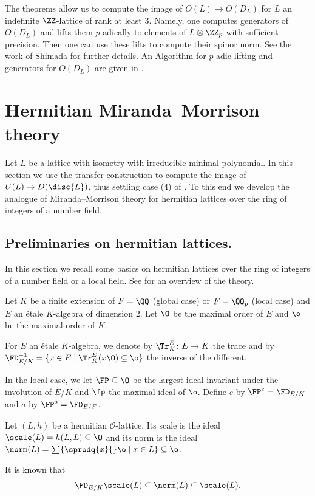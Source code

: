 \begin{remark}
 The theorems allow us to compute the image of $O(L) \to O(D_L)$ for $L$
 an indefinite $\ZZ$-lattice of rank at least $3$. Namely, one computes generators of $O(D_L)$ and lifts them $p$-adically to elements of $L\otimes \ZZ_p$ with sufficient precision. Then one can use these lifts to compute their spinor norm. See the work of Shimada \cite{shimada2018} for further details. An Algorithm for $p$-adic lifting and generators for $O(D_L)$ are given in \cite{brandhorst-veniani2023}.
\end{remark}

\section{Hermitian Miranda--Morrison theory}\label{hermitianmm}
Let $L$ be a lattice with isometry with irreducible minimal polynomial.
In this section we use the transfer construction to compute the image of
$U(L) \to D(\disc{L})$, thus settling case (4) of .  To this end we develop the analogue of Miranda--Morrison theory for hermitian lattices over the ring of integers of a number field.

\subsection{Preliminaries on hermitian lattices.}
In this section we recall some basics on hermitian lattices over the ring of integers of a number field or a local field. See \cite{KirschmerHabil} for an overview of the theory.

Let $K$ be a finite extension of $F=\QQ$ (global case) or $F=\QQ_p$ (local case) and $E$ an étale $K$-algebra of dimension $2$.
Let $\O$ be the maximal order of $E$ and $\o$ be the maximal order of $K$.

\begin{definition}
 For $E$ an \'etale $K$-algebra, we denote by
 $\Tr^E_K \colon E \to K$ the trace and by
  $\FD_{E/K}^{-1}=\{ x \in E \mid \Tr^E_K(x \O) \subseteq \o \}$
 the inverse of the different.
\end{definition}

In the local case, we let $\FP\subseteq \O$ be the largest ideal invariant under the involution of $E/K$ and $\fp$ the maximal ideal of $\o$. Define $e$ by $\FP^e = \FD_{E/K}$ and $a$ by $\FP^a = \FD_{E/F}$.

\begin{definition}
 Let $(L,h)$ be a hermitian $\mathcal O$-lattice. Its scale is the ideal $\scale(L)=h(L,L)\subseteq \O$ and its norm is the ideal $\norm(L)=\sum \{ \sprodq{x}{}\o \mid x \in L \} \subseteq \o$.
\end{definition}
It is known that
\begin{equation}\label{norm-vs-scale}
 \FD_{E/K} \scale(L) \subseteq \norm(L) \subseteq \scale(L).
\end{equation}

